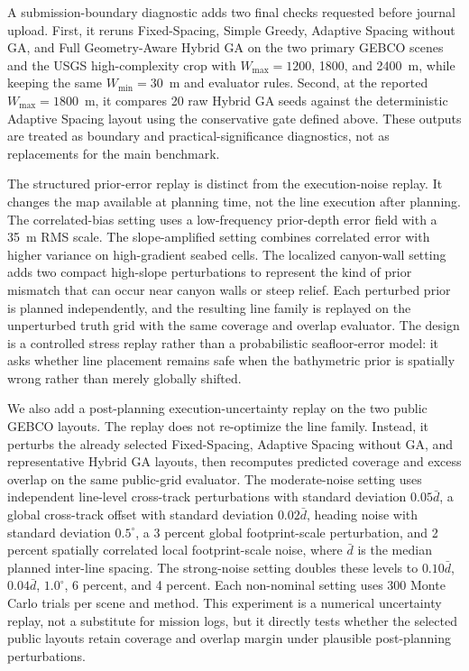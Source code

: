 \documentclass[jmse,article,submit,moreauthors]{Definitions/mdpi}
\begin{document}
A submission-boundary diagnostic adds two final checks requested before journal upload. First, it reruns Fixed-Spacing, Simple Greedy, Adaptive Spacing without GA, and Full Geometry-Aware Hybrid GA on the two primary GEBCO scenes and the USGS high-complexity crop with \(W_{\max}=1200\), 1800, and 2400~m, while keeping the same \(W_{\min}=30\)~m and evaluator rules. Second, at the reported \(W_{\max}=1800\)~m, it compares 20 raw Hybrid GA seeds against the deterministic Adaptive Spacing layout using the conservative gate defined above. These outputs are treated as boundary and practical-significance diagnostics, not as replacements for the main benchmark.

The structured prior-error replay is distinct from the execution-noise replay. It changes the map available at planning time, not the line execution after planning. The correlated-bias setting uses a low-frequency prior-depth error field with a 35~m RMS scale. The slope-amplified setting combines correlated error with higher variance on high-gradient seabed cells. The localized canyon-wall setting adds two compact high-slope perturbations to represent the kind of prior mismatch that can occur near canyon walls or steep relief. Each perturbed prior is planned independently, and the resulting line family is replayed on the unperturbed truth grid with the same coverage and overlap evaluator. The design is a controlled stress replay rather than a probabilistic seafloor-error model: it asks whether line placement remains safe when the bathymetric prior is spatially wrong rather than merely globally shifted.

We also add a post-planning execution-uncertainty replay on the two public GEBCO layouts. The replay does not re-optimize the line family. Instead, it perturbs the already selected Fixed-Spacing, Adaptive Spacing without GA, and representative Hybrid GA layouts, then recomputes predicted coverage and excess overlap on the same public-grid evaluator. The moderate-noise setting uses independent line-level cross-track perturbations with standard deviation \(0.05\bar d\), a global cross-track offset with standard deviation \(0.02\bar d\), heading noise with standard deviation \(0.5^{\circ}\), a 3 percent global footprint-scale perturbation, and 2 percent spatially correlated local footprint-scale noise, where \(\bar d\) is the median planned inter-line spacing. The strong-noise setting doubles these levels to \(0.10\bar d\), \(0.04\bar d\), \(1.0^{\circ}\), 6 percent, and 4 percent. Each non-nominal setting uses 300 Monte Carlo trials per scene and method. This experiment is a numerical uncertainty replay, not a substitute for mission logs, but it directly tests whether the selected public layouts retain coverage and overlap margin under plausible post-planning perturbations.
\end{document}
